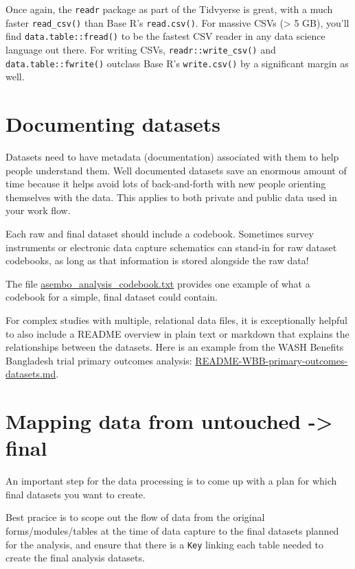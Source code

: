 \documentclass[
]{book}
\begin{document}
Once again, the \texttt{readr} package as part of the Tidvyerse is great, with a much faster \texttt{read\_csv()} than Base R's \texttt{read.csv()}. For massive CSVs (\textgreater{} 5 GB), you'll find \texttt{data.table::fread()} to be the fastest CSV reader in any data science language out there. For writing CSVs, \texttt{readr::write\_csv()} and \texttt{data.table::fwrite()} outclass Base R's \texttt{write.csv()} by a significant margin as well.

\section{Documenting datasets}\label{documenting-datasets}

Datasets need to have metadata (documentation) associated with them to help people understand them. Well documented datasets save an enormous amount of time because it helps avoid lots of back-and-forth with new people orienting themselves with the data. This applies to both private and public data used in your work flow.

Each raw and final dataset should include a codebook. Sometimes survey instruments or electronic data capture schematics can stand-in for raw dataset codebooks, as long as that information is stored alongside the raw data!

The file \href{https://github.com/ben-arnold/enterics-seroepi/blob/master/data/asembo_analysis_codebook.txt}{asembo\_analysis\_codebook.txt} provides one example of what a codebook for a simple, final dataset could contain.

For complex studies with multiple, relational data files, it is exceptionally helpful to also include a README overview in plain text or markdown that explains the relationships between the datasets. Here is an example from the WASH Benefits Bangladesh trial primary outcomes analysis: \href{https://osf.io/v3nfs/}{README-WBB-primary-outcomes-datasets.md}.

\section{Mapping data from untouched -\textgreater{} final}\label{mapping-data-from-untouched---final}

An important step for the data processing is to come up with a plan for which final datasets you want to create.

Best pracice is to scope out the flow of data from the original forms/modules/tables at the time of data capture to the final datasets planned for the analysis, and ensure that there is a \texttt{Key} linking each table needed to create the final analysis datasets.
\end{document}
